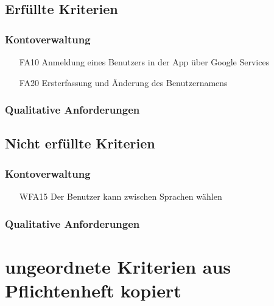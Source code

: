 \documentclass{scrartcl}
\begin{document}
	\subsection{Erfüllte Kriterien}
	\subsubsection{Kontoverwaltung}
	\begin{itemize}
		\item[FA10] Anmeldung eines Benutzers in der App über Google Services
		\item[FA20] Ersterfassung und Änderung des Benutzernamens
	\end{itemize}
	\subsubsection{Qualitative Anforderungen}
	
	\newpage
	\subsection{Nicht erfüllte Kriterien}
		\subsubsection{Kontoverwaltung}
		\begin{itemize}
			\item[WFA15] Der Benutzer kann zwischen Sprachen wählen
		\end{itemize}

	\subsubsection{Qualitative Anforderungen}
	
	\newpage
	\section{ungeordnete Kriterien aus Pflichtenheft kopiert}
\end{document}

